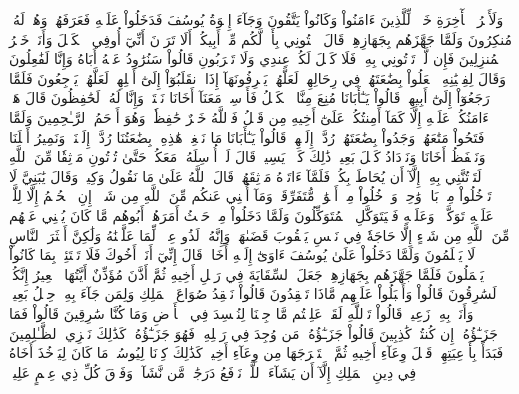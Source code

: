 وَلَأَجۡرُ ٱلۡأٓخِرَةِ خَيۡرٞ لِّلَّذِينَ ءَامَنُواْ وَكَانُواْ يَتَّقُونَ
وَجَآءَ إِخۡوَةُ يُوسُفَ فَدَخَلُواْ عَلَيۡهِ فَعَرَفَهُمۡ وَهُمۡ لَهُۥ مُنكِرُونَ
وَلَمَّا جَهَّزَهُم بِجَهَازِهِمۡ قَالَ ٱئۡتُونِي بِأَخٖ لَّكُم مِّنۡ أَبِيكُمۡۚ أَلَا تَرَوۡنَ أَنِّيٓ أُوفِي ٱلۡكَيۡلَ وَأَنَا۠ خَيۡرُ ٱلۡمُنزِلِينَ
فَإِن لَّمۡ تَأۡتُونِي بِهِۦ فَلَا كَيۡلَ لَكُمۡ عِندِي وَلَا تَقۡرَبُونِ
قَالُواْ سَنُرَٰوِدُ عَنۡهُ أَبَاهُ وَإِنَّا لَفَٰعِلُونَ
وَقَالَ لِفِتۡيَٰنِهِ ٱجۡعَلُواْ بِضَٰعَتَهُمۡ فِي رِحَالِهِمۡ لَعَلَّهُمۡ يَعۡرِفُونَهَآ إِذَا ٱنقَلَبُوٓاْ إِلَىٰٓ أَهۡلِهِمۡ لَعَلَّهُمۡ يَرۡجِعُونَ
فَلَمَّا رَجَعُوٓاْ إِلَىٰٓ أَبِيهِمۡ قَالُواْ يَـٰٓأَبَانَا مُنِعَ مِنَّا ٱلۡكَيۡلُ فَأَرۡسِلۡ مَعَنَآ أَخَانَا نَكۡتَلۡ وَإِنَّا لَهُۥ لَحَٰفِظُونَ
قَالَ هَلۡ ءَامَنُكُمۡ عَلَيۡهِ إِلَّا كَمَآ أَمِنتُكُمۡ عَلَىٰٓ أَخِيهِ مِن قَبۡلُ فَٱللَّهُ خَيۡرٌ حَٰفِظٗاۖ وَهُوَ أَرۡحَمُ ٱلرَّـٰحِمِينَ
وَلَمَّا فَتَحُواْ مَتَٰعَهُمۡ وَجَدُواْ بِضَٰعَتَهُمۡ رُدَّتۡ إِلَيۡهِمۡۖ قَالُواْ يَـٰٓأَبَانَا مَا نَبۡغِيۖ هَٰذِهِۦ بِضَٰعَتُنَا رُدَّتۡ إِلَيۡنَاۖ وَنَمِيرُ أَهۡلَنَا وَنَحۡفَظُ أَخَانَا وَنَزۡدَادُ كَيۡلَ بَعِيرٖۖ ذَٰلِكَ كَيۡلٞ يَسِيرٞ
قَالَ لَنۡ أُرۡسِلَهُۥ مَعَكُمۡ حَتَّىٰ تُؤۡتُونِ مَوۡثِقٗا مِّنَ ٱللَّهِ لَتَأۡتُنَّنِي بِهِۦٓ إِلَّآ أَن يُحَاطَ بِكُمۡۖ فَلَمَّآ ءَاتَوۡهُ مَوۡثِقَهُمۡ قَالَ ٱللَّهُ عَلَىٰ مَا نَقُولُ وَكِيلٞ
وَقَالَ يَٰبَنِيَّ لَا تَدۡخُلُواْ مِنۢ بَابٖ وَٰحِدٖ وَٱدۡخُلُواْ مِنۡ أَبۡوَٰبٖ مُّتَفَرِّقَةٖۖ وَمَآ أُغۡنِي عَنكُم مِّنَ ٱللَّهِ مِن شَيۡءٍۖ إِنِ ٱلۡحُكۡمُ إِلَّا لِلَّهِۖ عَلَيۡهِ تَوَكَّلۡتُۖ وَعَلَيۡهِ فَلۡيَتَوَكَّلِ ٱلۡمُتَوَكِّلُونَ
وَلَمَّا دَخَلُواْ مِنۡ حَيۡثُ أَمَرَهُمۡ أَبُوهُم مَّا كَانَ يُغۡنِي عَنۡهُم مِّنَ ٱللَّهِ مِن شَيۡءٍ إِلَّا حَاجَةٗ فِي نَفۡسِ يَعۡقُوبَ قَضَىٰهَاۚ وَإِنَّهُۥ لَذُو عِلۡمٖ لِّمَا عَلَّمۡنَٰهُ وَلَٰكِنَّ أَكۡثَرَ ٱلنَّاسِ لَا يَعۡلَمُونَ
وَلَمَّا دَخَلُواْ عَلَىٰ يُوسُفَ ءَاوَىٰٓ إِلَيۡهِ أَخَاهُۖ قَالَ إِنِّيٓ أَنَا۠ أَخُوكَ فَلَا تَبۡتَئِسۡ بِمَا كَانُواْ يَعۡمَلُونَ
فَلَمَّا جَهَّزَهُم بِجَهَازِهِمۡ جَعَلَ ٱلسِّقَايَةَ فِي رَحۡلِ أَخِيهِ ثُمَّ أَذَّنَ مُؤَذِّنٌ أَيَّتُهَا ٱلۡعِيرُ إِنَّكُمۡ لَسَٰرِقُونَ
قَالُواْ وَأَقۡبَلُواْ عَلَيۡهِم مَّاذَا تَفۡقِدُونَ
قَالُواْ نَفۡقِدُ صُوَاعَ ٱلۡمَلِكِ وَلِمَن جَآءَ بِهِۦ حِمۡلُ بَعِيرٖ وَأَنَا۠ بِهِۦ زَعِيمٞ
قَالُواْ تَٱللَّهِ لَقَدۡ عَلِمۡتُم مَّا جِئۡنَا لِنُفۡسِدَ فِي ٱلۡأَرۡضِ وَمَا كُنَّا سَٰرِقِينَ
قَالُواْ فَمَا جَزَـٰٓؤُهُۥٓ إِن كُنتُمۡ كَٰذِبِينَ
قَالُواْ جَزَـٰٓؤُهُۥ مَن وُجِدَ فِي رَحۡلِهِۦ فَهُوَ جَزَـٰٓؤُهُۥۚ كَذَٰلِكَ نَجۡزِي ٱلظَّـٰلِمِينَ
فَبَدَأَ بِأَوۡعِيَتِهِمۡ قَبۡلَ وِعَآءِ أَخِيهِ ثُمَّ ٱسۡتَخۡرَجَهَا مِن وِعَآءِ أَخِيهِۚ كَذَٰلِكَ كِدۡنَا لِيُوسُفَۖ مَا كَانَ لِيَأۡخُذَ أَخَاهُ فِي دِينِ ٱلۡمَلِكِ إِلَّآ أَن يَشَآءَ ٱللَّهُۚ نَرۡفَعُ دَرَجَٰتٖ مَّن نَّشَآءُۗ وَفَوۡقَ كُلِّ ذِي عِلۡمٍ عَلِيمٞ
